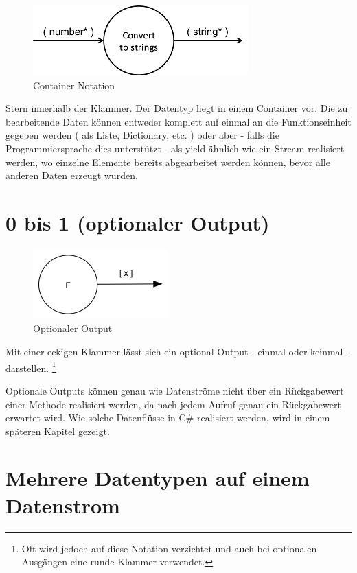 \begin{figure}[!htbp]
	\centering
	\includegraphics[width=.7\linewidth]{./img/diagramCollection.png}
	\caption{Container Notation}
\end{figure}


Stern innerhalb der Klammer.
Der Datentyp liegt in einem Container vor.
Die zu bearbeitende Daten können entweder komplett auf einmal an die Funktionseinheit gegeben werden ( als Liste, Dictionary, etc. )
oder aber - falls die Programmiersprache dies unterstützt - als yield ähnlich
wie ein Stream realisiert werden, wo einzelne Elemente bereits abgearbeitet werden
können, bevor alle anderen Daten erzeugt wurden.

\section{0 bis 1 (optionaler Output)}

\begin{figure}[!htbp]
	\centering
	\includegraphics[width=.5\linewidth]{./img/diagramOptional.png}
	\caption{Optionaler Output}
\end{figure}


Mit einer eckigen Klammer lässt sich ein optional Output - einmal oder keinmal -
darstellen. \footnote{Oft wird jedoch auf diese Notation verzichtet und auch bei optionalen Ausgängen eine runde Klammer verwendet. 
}

Optionale Outputs können genau wie Datenströme nicht über ein Rückgabewert einer
Methode realisiert werden, da nach jedem Aufruf genau ein Rückgabewert erwartet wird. Wie solche
Datenflüsse in C\# realisiert werden, wird in einem späteren Kapitel gezeigt.

\section{Mehrere Datentypen auf einem Datenstrom}


